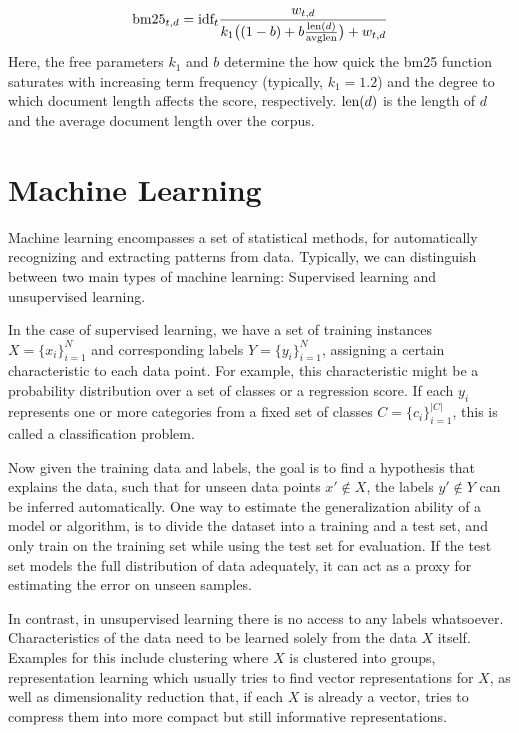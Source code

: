 \begin{equation}
    \text{bm25}_{t,d} = \text{idf}_t \frac{w_{t,d}}{k_1 \big((1 - b) + b \frac{\text{len}(d)}{\text{avglen}}\big) + w_{t,d}}
\end{equation}
Here, the free parameters $k_1$ and $b$ determine the how quick the bm25 function saturates with increasing term frequency (typically, $k_1=1.2$) and the degree to which document length affects the score, respectively. $\text{len}(d)$ is the length of $d$ and  the average document length over the corpus.

\section{Machine Learning}
Machine learning encompasses a set of statistical methods, for automatically recognizing and extracting patterns from data. Typically, we can distinguish between two main types of machine learning: Supervised learning and unsupervised learning.

In the case of supervised learning, we have a set of training instances $X = \{x_i\}_{i=1}^N$ and corresponding labels $Y = \{y_i\}_{i=1}^N$, assigning a certain characteristic to each data point. For example, this characteristic might be a probability distribution over a set of classes or a regression score. If each $y_i$ represents one or more categories from a fixed set of classes $C = \{c_i\}_{i=1}^{|C|}$, this is called a classification problem.

Now given the training data and labels, the goal is to find a hypothesis that explains the data, such that for unseen data points $x' \notin X$, the labels $y' \notin Y$ can be inferred automatically. One way to estimate the generalization ability of a model or algorithm, is to divide the dataset into a training and a test set, and only train on the training set while using the test set for evaluation. If the test set models the full distribution of data adequately, it can act as a proxy for estimating the error on unseen samples.

In contrast, in unsupervised learning there is no access to any labels whatsoever. Characteristics of the data need to be learned solely from the data $X$ itself. Examples for this include clustering where $X$ is clustered into groups, representation learning which usually tries to find vector representations for $X$, as well as dimensionality reduction that, if each $X$ is already a vector, tries to compress them into more compact but still informative representations.

